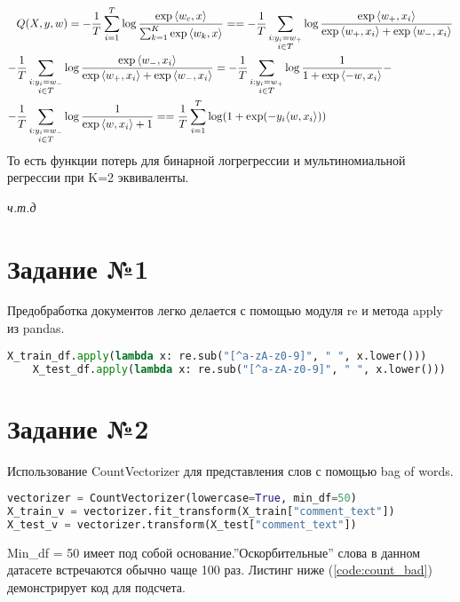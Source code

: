 \documentclass[12pt,fleqn]{article}
\begin{document}
\begin{align}
    \notag & Q(X,y,w) = -\frac{1}{T}\sum_{i=1}^{T}\log
    \frac{\exp{\langle w_c,x \rangle}}{\sum_{k=1}^{K}\exp{\langle w_k,x \rangle}}=
     = - \frac{1}{T}\sum_{\substack{i:y_i=w_{+} \\ i\in T}}
    \log\frac{\exp{\langle w_{+}, x_i \rangle}}{\exp{\langle w_{+}, x_i \rangle}+\exp{\langle w_{-}, x_i \rangle}}\\
    \notag - &\frac{1}{T}\sum_{\substack{i:y_i=w_{-} \\ i\in T}}
    \log\frac{\exp{\langle w_{-}, x_i \rangle}}{\exp{\langle w_{+}, x_i \rangle}+\exp{\langle w_{-}, x_i \rangle}} = 
     - \frac{1}{T}\sum_{\substack{i:y_i=w_{+} \\ i\in T}}\log\frac{1}{1+\exp{\langle -w, x_i \rangle}}- \\
    \notag- &\frac{1}{T}\sum_{\substack{i:y_i=w_{-} \\ i\in T}}\log\frac{1}{\exp{\langle w, x_i \rangle} + 1} = 
    = \frac{1}{T}\sum_{i=1}^{T}\log(1+\exp(-y_i\langle w,x_i \rangle))
\end{align}
То есть функции потерь для бинарной логрегрессии и мультиномиальной регрессии 
при K=2 эквиваленты.

\noindent\textit{ч.т.д}
\section{Задание №1}
\noindent Предобработка документов легко делается с помощью модуля re и метода apply из pandas.
\begin{lstlisting}[language=Python, caption=Clear documents]
    X_train_df.apply(lambda x: re.sub("[^a-zA-z0-9]", " ", x.lower()))
    X_test_df.apply(lambda x: re.sub("[^a-zA-z0-9]", " ", x.lower()))
\end{lstlisting}
\section{Задание №2}
\noindent Использование CountVectorizer для представления слов с помощью bag of words.

\begin{lstlisting}[language=Python, caption=Vectorizer]
vectorizer = CountVectorizer(lowercase=True, min_df=50)
X_train_v = vectorizer.fit_transform(X_train["comment_text"])
X_test_v = vectorizer.transform(X_test["comment_text"])
\end{lstlisting}

\noindent Min\_df = 50 имеет под собой основание.''Оскорбительные'' слова в данном датасете 
встречаются обычно чаще 100 раз. Листинг ниже (\ref{code:count_bad}) демонстрирует код для подсчета.
\end{document}

